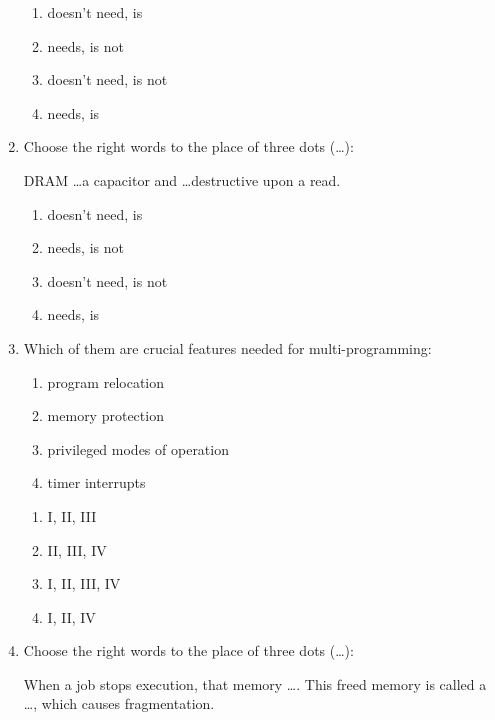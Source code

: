\documentclass[paper=8.2in:11.6in]{scrartcl}
\begin{document}
\begin{enumerate}
\begin{enumerate}[label=\alph*)]
\item doesn't need, is
\item needs, is not
\item doesn't need, is not
\item needs, is

\end{enumerate}

\item Choose the right words to the place of three dots (\ldots):

DRAM \ldots a capacitor and \ldots destructive upon a read.

\begin{enumerate}[label=\alph*)]

\item doesn't need, is
\item needs, is not
\item doesn't need, is not
\item needs, is

\end{enumerate}

\item Which of them are crucial features needed for multi-programming:

\begin{enumerate}[label=\Roman*.]

\item program relocation
\item memory protection
\item privileged modes of operation
\item timer interrupts

\end{enumerate}

\begin{enumerate}[label=\alph*)]

\item I, II, III
\item II, III, IV
\item I, II, III, IV
\item I, II, IV

\end{enumerate}

\item Choose the right words to the place of three dots (\ldots):

When a job stops execution, that memory \ldots . This freed memory is called a \ldots , which causes fragmentation.

\begin{enumerate}[label=\alph*)]


\end{enumerate}
\end{enumerate}
\end{document}
